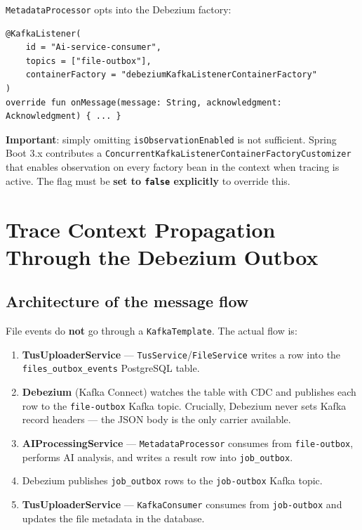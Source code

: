 \documentclass[11pt,a4paper]{article}
\begin{document}
\texttt{MetadataProcessor} opts into the Debezium factory:
\begin{lstlisting}[style=kotlin, caption={MetadataProcessor.kt --- @KafkaListener}]
@KafkaListener(
    id = "Ai-service-consumer",
    topics = ["file-outbox"],
    containerFactory = "debeziumKafkaListenerContainerFactory"
)
override fun onMessage(message: String, acknowledgment: Acknowledgment) { ... }
\end{lstlisting}

\textbf{Important}: simply omitting \texttt{isObservationEnabled} is not
sufficient.  Spring Boot 3.x contributes a
\texttt{ConcurrentKafkaListenerContainerFactoryCustomizer} that enables
observation on every factory bean in the context when tracing is active.  The
flag must be \textbf{set to \texttt{false} explicitly} to override this.

\section{Trace Context Propagation Through the Debezium Outbox}
\label{sec:debezium}

\subsection{Architecture of the message flow}

File events do \textbf{not} go through a \texttt{KafkaTemplate}.  The actual
flow is:

\begin{enumerate}
  \item \textbf{TusUploaderService} --- \texttt{TusService}/\texttt{FileService}
        writes a row into the \texttt{files\_outbox\_events} PostgreSQL table.
  \item \textbf{Debezium} (Kafka Connect) watches the table with CDC and
        publishes each row to the \texttt{file-outbox} Kafka topic.
        Crucially, Debezium never sets Kafka record headers --- the JSON body
        is the only carrier available.
  \item \textbf{AIProcessingService} --- \texttt{MetadataProcessor} consumes
        from \texttt{file-outbox}, performs AI analysis, and writes a result
        row into \texttt{job\_outbox}.
  \item Debezium publishes \texttt{job\_outbox} rows to the
        \texttt{job-outbox} Kafka topic.
  \item \textbf{TusUploaderService} --- \texttt{KafkaConsumer} consumes from
        \texttt{job-outbox} and updates the file metadata in the database.
\end{enumerate}
\end{document}

